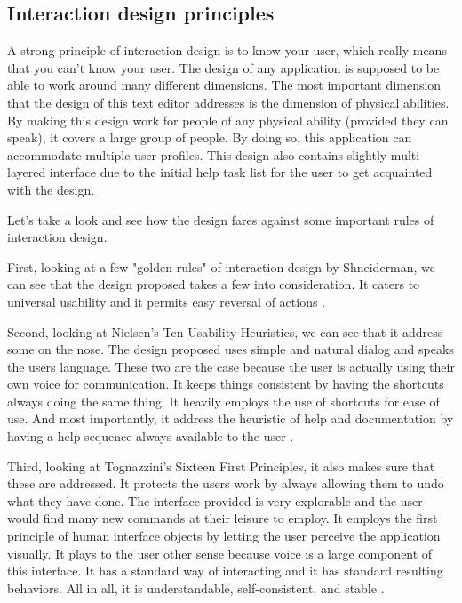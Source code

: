 \documentclass[11pt, oneside]{article}
\begin{document}
	\subsection{Interaction design principles}
	A strong principle of interaction design is to know your user, which really means that you can't know your user. The design of any application is supposed to be able to work around many different dimensions. The most important dimension that the design of this text editor addresses is the dimension of physical abilities. By making this design work for people of any physical ability (provided they can speak), it covers a large group of people. By doing so, this application can accommodate multiple user profiles. This design also contains slightly multi layered interface due to the initial help task list for the user to get acquainted with the design.

	Let's take a look and see how the design fares against some important rules of interaction design.

	First, looking at a few "golden rules" of interaction design by Shneiderman, we can see that the design proposed takes a few into consideration. It caters to universal usability and it permits easy reversal of actions \cite{shniederman-golden-rules}.

	Second, looking at Nielsen's Ten Usability Heuristics, we can see that it address some on the nose. The design proposed uses simple and natural dialog and speaks the users language. These two are the case because the user is actually using their own voice for communication.
It keeps things consistent by having the shortcuts always doing the same thing. It heavily employs the use of shortcuts for ease of use. And most importantly, it address the heuristic of help and documentation by having a help sequence always available to the user \cite{nielsen-usability-heuristics}.

	Third, looking at Tognazzini's Sixteen First Principles, it also makes sure that these are addressed. It protects the users work by always allowing them to undo what they have done. The interface provided is very explorable and the user would find many new commands at their leisure to employ. It employs the first principle of human interface objects by letting the user perceive the application visually.
It plays to the user other sense because voice is a large component of this interface. It has a standard way of interacting and it has standard resulting behaviors. All in all, it is understandable, self-consistent, and stable \cite{tognazzini-first-principles}.
\end{document}
